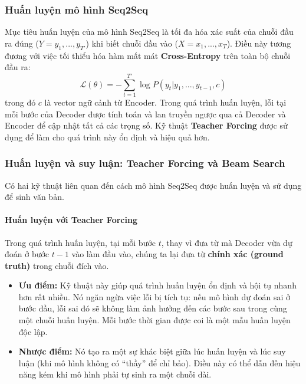 \subsubsection{Huấn luyện mô hình Seq2Seq}
Mục tiêu huấn luyện của mô hình Seq2Seq là tối đa hóa xác suất của chuỗi đầu ra đúng ($Y = y_1, ..., y_{T'}$) khi biết chuỗi đầu vào ($X = x_1, ..., x_T$). Điều này tương đương với việc tối thiểu hóa hàm mất mát \textbf{Cross-Entropy} trên toàn bộ chuỗi đầu ra:
$$ \mathcal{L}(\theta) = - \sum_{t=1}^{T'} \log P(y_t | y_1, ..., y_{t-1}, c) $$
trong đó $c$ là vector ngữ cảnh từ Encoder. Trong quá trình huấn luyện, lỗi tại mỗi bước của Decoder được tính toán và lan truyền ngược qua cả Decoder và Encoder để cập nhật tất cả các trọng số. Kỹ thuật \textbf{Teacher Forcing} được sử dụng để làm cho quá trình này ổn định và hiệu quả hơn.

\subsubsection{Huấn luyện và suy luận: Teacher Forcing và Beam Search}
Có hai kỹ thuật liên quan đến cách mô hình Seq2Seq được huấn luyện và sử dụng để sinh văn bản.

\paragraph{Huấn luyện với Teacher Forcing}
Trong quá trình huấn luyện, tại mỗi bước $t$, thay vì đưa từ mà Decoder vừa dự đoán ở bước $t-1$ vào làm đầu vào, chúng ta lại đưa từ \textbf{chính xác (ground truth)} trong chuỗi đích vào.
\begin{itemize}
    \item \textbf{Ưu điểm:} Kỹ thuật này giúp quá trình huấn luyện ổn định và hội tụ nhanh hơn rất nhiều. Nó ngăn ngừa việc lỗi bị tích tụ: nếu mô hình dự đoán sai ở bước đầu, lỗi sai đó sẽ không làm ảnh hưởng đến các bước sau trong cùng một chuỗi huấn luyện. Mỗi bước thời gian được coi là một mẫu huấn luyện độc lập.
    \item \textbf{Nhược điểm:} Nó tạo ra một sự khác biệt giữa lúc huấn luyện và lúc suy luận (khi mô hình không có “thầy” để chỉ bảo). Điều này có thể dẫn đến hiệu năng kém khi mô hình phải tự sinh ra một chuỗi dài.
\end{itemize}

